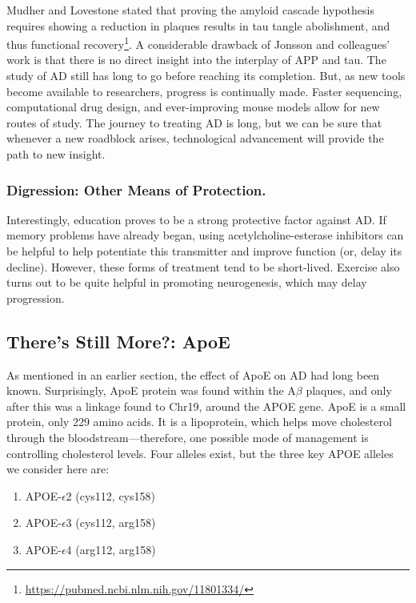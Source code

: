 Mudher and Lovestone stated that proving the amyloid cascade hypothesis requires showing a reduction in plaques results in tau tangle abolishment, and thus functional recovery\footnote{\url{https://pubmed.ncbi.nlm.nih.gov/11801334/}}. A considerable drawback of Jonsson and colleagues' work is that there is no direct insight into the interplay of APP and tau. The study of AD still has long to go before reaching its completion. But, as new tools become available to researchers, progress is continually made. Faster sequencing, computational drug design, and ever-improving mouse models allow for new routes of study. The journey to treating AD is long, but we can be sure that whenever a new roadblock arises, technological advancement will provide the path to new insight. 

\subsubsection*{Digression: Other Means of Protection.}

Interestingly, education proves to be a strong protective factor against AD. If memory problems have already began, using acetylcholine-esterase inhibitors can be helpful to help potentiate this transmitter and improve function (or, delay its decline). However, these forms of treatment tend to be short-lived. Exercise also turns out to be quite helpful in promoting neurogenesis, which may delay progression.


\subsection*{There's Still More?: ApoE}

As mentioned in an earlier section, the effect of ApoE on AD had long been known. Surprisingly, ApoE protein was found within the A$\beta$ plaques, and only after this was a linkage found to Chr19, around the APOE gene. ApoE is a small protein, only 229 amino acids. It is a lipoprotein, which helps move cholesterol through the bloodstream---therefore, one possible mode of management is controlling cholesterol levels. Four alleles exist, but the three key APOE alleles we consider here are: 

\begin{enumerate}
    \itemsep 0em
    \item APOE-$\epsilon$2 (cys112, cys158)
    \item APOE-$\epsilon$3 (cys112, arg158)
    \item APOE-$\epsilon$4 (arg112, arg158)
\end{enumerate}

